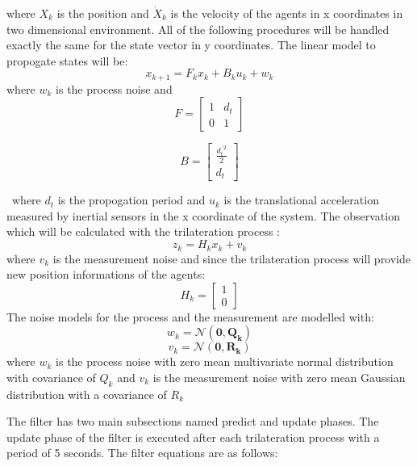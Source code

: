 \documentclass[twoside]{article}
\begin{document}
	where $X_k$ is the position and $\dot{X}_k$ is the velocity of the agents in x coordinates in two dimensional environment. All of the following procedures will be handled exactly the same for the state vector in y coordinates.
	The linear model to propogate states will be:
	\begin{equation}
  x_{k+1} = F_k     x_{k} + B_ku_k + w_k
	\end{equation}
	where $w_k$ is the process noise and 
	\begin{equation}
   F = \begin{bmatrix}
1 & d_t\\
0 & 1
\end{bmatrix}   
	\end{equation}
	
	\begin{equation}
B = \begin{bmatrix}
\frac{{d_t}^2}{2} \\
d_t
\end{bmatrix}
	\end{equation}
	
	\
	where $d_t$ is the propogation period and $u_k$ is the translational acceleration measured by inertial sensors in the x coordinate of the system. The observation which will be calculated with the trilateration process :
	\begin{equation}
z_k = H_kx_k + v_k
	\end{equation}
	where $v_k$ is the measurement noise and since the trilateration process will provide new position informations of the agents:
	\begin{equation}
H_k = \begin{bmatrix}
1\\0
\end{bmatrix}
	\end{equation}
	The noise models for the process and the measurement are modelled with:
	\begin{equation}
 w_k = \mathcal{N}(\mathbf{0,Q_k})
	\end{equation}
		\begin{equation}
		v_k = \mathcal{N}(\mathbf{0,R_k})
		\end{equation}
		where $w_k$ is the process noise with zero mean multivariate normal distribution with covariance of $Q_k$ and $v_k$ is the measurement noise with zero mean Gaussian distribution with a covariance of $R_k$
		
		The filter has two main subsections named predict and update phases. The update phase of the filter is executed after each trilateration process with a period of 5 seconds. The filter equations are as follows:
		
\end{document}

